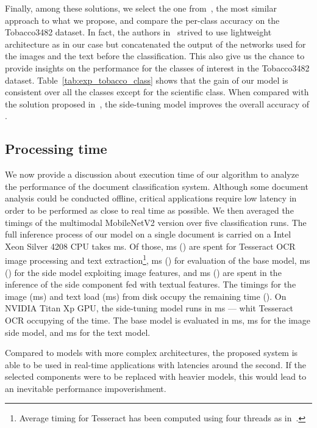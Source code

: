Finally, among these solutions, we select the one from~\cite{audebert}, the most similar approach to what we propose, and compare the per-class accuracy on the Tobacco3482 dataset.
In fact, the authors in~\cite{audebert} strived to use lightweight architecture as in our case but concatenated the output of the networks used for the images and the text before the classification. 
This also give us the chance to provide insights on the performance for the classes of interest in the Tobacco3482 dataset.
Table~\ref{tab:exp_tobacco_class} shows that the gain of our model is consistent over all the classes except for the scientific class. 
When compared with the solution proposed in~\cite{audebert}, the side-tuning model improves the overall accuracy of .

\subsection{Processing time}\label{subsec:exp_time}
We now provide a discussion about execution time of our algorithm to analyze the performance of the document classification system.
Although some document analysis could be conducted offline, critical applications require low latency in order to be performed as close to real time as possible.
We then averaged the timings of the multimodal MobileNetV2 version over five classification runs.
The full inference process of our model on a single document is carried on a Intel Xeon Silver 4208 CPU takes ms. 
Of those, ms () are spent for Tesseract OCR image processing and text extraction\footnote{Average timing for Tesseract has been computed using four threads as in~\cite{audebert}.}, ms () for evaluation of the base model, ms () for the side model exploiting image features, and ms () are spent in the inference of the side component fed with textual features.
The timings for the image (ms) and text load (ms) from disk occupy the remaining time ().
On NVIDIA Titan Xp GPU, the side-tuning model runs in ms --- whit Tesseract OCR occupying  of the time. The base model is evaluated in ms, ms for the image side model, and ms for the text model.

Compared to models with more complex architectures, the proposed system is able to be used in real-time applications with latencies around the second. If the selected components were to be replaced with heavier models, this would lead to an inevitable performance impoverishment.
